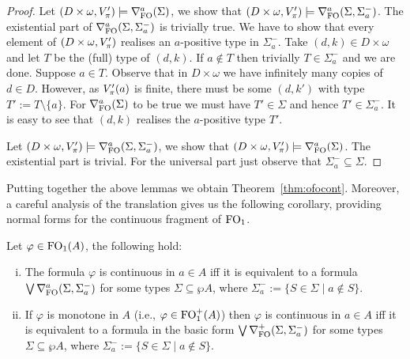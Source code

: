 \begin{proof}
\bigskip
\noindent \fbox{$\Rightarrow$}
Let $(D\times\omega,\val'_\pi) \models \mondbnfofo{\Sigma}{a}$, we show that $(D\times\omega,\val'_\pi) \models \mondgbnfofo{\Sigma}{\Sigma^{-}_{a}}{a}$. The existential part of $\mondgbnfofo{\Sigma}{\Sigma^{-}_{a}}{a}$ is trivially true. We have to show that every element of $(D\times\omega,\val'_\pi)$ realises an $a$-positive type in $\Sigma^{-}_{a}$. Take $(d,k) \in D\times\omega$ and let $T$ be the (full) type of $(d,k)$. If $a\notin T$ then trivially $T\in \Sigma^{-}_{a}$ and we are done. Suppose $a\in T$. Observe that in $D\times\omega$ we have infinitely many copies of $d\in D$. However, as $\val'_\pi(a)$ is finite, there must be some $(d,k')$ with type $T' := T\setminus\{a\}$.
For $\mondbnfofo{\Sigma}{a}$ to be true we must have $T'\in \Sigma$ and hence $T'\in \Sigma^{-}_{a}$. It is easy to see that $(d,k)$ realises the $a$-positive type $T'$.

\bigskip
\noindent \fbox{$\Leftarrow$}
Let $(D\times\omega,\val'_\pi) \models \mondgbnfofo{\Sigma}{\Sigma^{-}_{a}}{a}$, we show that $(D\times\omega,\val'_\pi) \models \mondbnfofo{\Sigma}{a}$. The existential part is trivial. For the universal part just observe that $\Sigma^{-}_{a} \subseteq \Sigma$.
\end{proof}

Putting together the above lemmas we obtain Theorem~\ref{thm:ofocont}. Moreover, a careful analysis of the translation gives us the following corollary, providing normal forms for the continuous fragment of $\ofo$.

\begin{corollary}\label{cor:ofocontinuousnf}
	Let $\varphi \in \ofo(A)$, the following hold:
	\begin{enumerate}[(i)]
		\item The formula $\varphi$ is continuous in $a \in A$ iff it is equivalent to a formula $\bigvee \mondgbnfofo{\Sigma}{\Sigma^{-}_{a}}{a}$ for some types $\Sigma \subseteq \wp A$, where $\Sigma^{-}_{a} := \{S\in \Sigma \mid a\notin S\}$.
		\item If $\varphi$ is monotone in $A$ (i.e., $\varphi\in\ofo^+(A)$) then $\varphi$ is continuous in $a \in A$ iff it is equivalent to a formula in the basic form $\bigvee \posdgbnfofo{\Sigma}{\Sigma^{-}_{a}}$ for some types $\Sigma \subseteq \wp A$, where $\Sigma^{-}_{a} := \{S\in \Sigma \mid a\notin S\}$.
	\end{enumerate}
\end{corollary}

